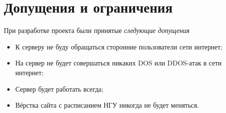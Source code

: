\chapter{Допущения и ограничения}
	\label{chapter5}

	При разработке проекта были принятые \textit{следующие допущения}
	\begin{itemize}
		\item К серверу не буду обращаться сторонние пользователи сети интернет;
		
		\item На сервер не будет совершаться никаких DOS или DDOS-атак в сети интернет;
				
		\item Сервер будет работать всегда;
		
		\item Вёрстка сайта с расписанием НГУ никогда не будет меняться.
	\end{itemize}
